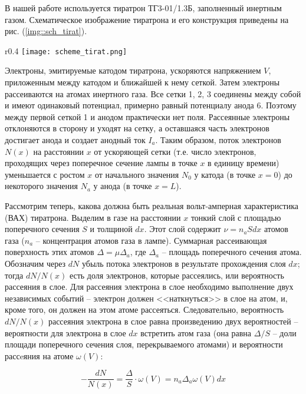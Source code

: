 В нашей работе используется тиратрон ТГ3-01/1.3Б, заполненный инертным газом.
Схематическое изображение тиратрона и его конструкция приведены на рис.
(\ref{img::sch_tirat}).
\begin{wrapfigure}{r}{0.4\textwidth}
  \centering
  \texttt{[image: scheme\_tirat.png]}
  \caption{{Схема тиратрона (слева) и его конструкция (справа): \\
  1, 2, 3 --- сетки, 4 --- внешний металлический цилиндр, 5 --- катод, \\ 6 ---
  анод, 7 --- накаливаемая спираль}}
  \label{img::sch_tirat}
\end{wrapfigure}
Электроны, эмитируемые катодом тиратрона, ускоряются напряжением $V$,
приложенным между катодом и ближайшей к нему сеткой. Затем электроны
рассеиваются на атомах инертного газа. Все сетки 1, 2, 3 соединены между собой и
имеют одинаковый потенциал, примерно равный потенциалу анода 6. Поэтому между
первой сеткой 1 и анодом практически нет поля. Рассеянные электроны отклоняются
в сторону и уходят на сетку, а оставшаяся часть электронов достигает анода и
создает анодный ток $I_a$. Таким образом, поток электронов $N(x)$ на расстоянии
$x$ от ускоряющей сетки (т.е. число электронов, проходящих через поперечное
сечение лампы в точке $x$ в единицу времени) уменьшается с ростом $x$ от
начального значения $N_0$ у катода (в точке $x = 0$) до некоторого значения
$N_a$ у анода (в точке $x = L$).

Рассмотрим теперь, какова должна быть реальная вольт-амперная характеристика
(ВАХ) тиратрона. Выделим в газе на расстоянии $x$ тонкий слой с площадью
поперечного сечения $S$ и толщиной $dx$. Этот слой содержит $\nu = n_a S dx$
атомов газа ($n_a$ -- концентрация атомов газа в лампе). Суммарная рассеивающая
поверхность этих атомов $\Delta = \mu \Delta_a$, где $\Delta_a$ -- площадь
поперечного сечения атома. Обозначим через $dN$ убыль потока электронов в
результате прохождения слоя $dx$; тогда $dN/N(x)$ есть доля электронов, которые
рассеялись, или вероятность рассеяния в слое. Для рассеяния электрона в слое
необходимо выполнение двух независимых событий -- электрон должен <<наткнуться>>
в слое на атом, и, кроме того, он должен на этом атоме рассеяться.
Следовательно, вероятность $dN/N(x)$ рассеяния электрона в слое равна
произведению двух вероятностей -- вероятности для электрона в слое $dx$
встретить атом газа (она равна $\Delta / S$ -- доли площади поперечного сечения
слоя, перекрываемого атомами) и вероятности рассeяния на атоме $\omega(V)$:

\begin{equation}
  - \frac{dN}{N(x)} = \frac{\Delta}{S} \cdot \omega(V) = n_a \Delta_a \omega(V) dx
\end{equation}

